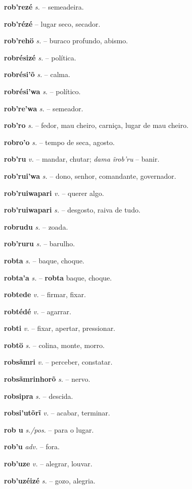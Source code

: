 \textbf{rob'rezé} \textit{s.} -- semeadeira.

\textbf{rob'rézé} \textit{} -- lugar seco, secador.

\textbf{rob'rehö} \textit{s.} -- buraco profundo, abismo.

\textbf{robrésizé} \textit{s.} -- política.

\textbf{robrési'õ} \textit{s.} -- calma.

\textbf{robrési'wa} \textit{s.} -- político.

\textbf{rob're'wa} \textit{s.} -- semeador.

\textbf{rob'ro} \textit{s.} -- fedor, mau cheiro, carniça, lugar de mau cheiro.

\textbf{robro'o} \textit{s.} -- tempo de seca, agosto.

\textbf{rob'ru} \textit{v.} -- mandar, chutar; \textit{dama ĩrob'ru} -- banir.

\textbf{rob'rui'wa} \textit{s.} -- dono, senhor, comandante, governador.

\textbf{rob'ruiwapari} \textit{v.} -- querer algo.

\textbf{rob'ruiwapari} \textit{s.} -- desgosto, raiva de tudo.

\textbf{robrudu} \textit{s.} -- zoada.

\textbf{rob'ruru} \textit{s.} -- barulho.

\textbf{robta} \textit{s.} -- baque, choque.

\textbf{robta'a} \textit{s.} -- \textbf{robta} baque, choque.

\textbf{robtede} \textit{v.} -- firmar, fixar.

\textbf{robtédé} \textit{v.} -- agarrar.

\textbf{robti} \textit{v.} -- fixar, apertar, pressionar.

\textbf{robtö} \textit{s.} -- colina, monte, morro.

\textbf{robsãmri} \textit{v.} -- perceber, constatar.

\textbf{robsãmrinhorõ} \textit{s.} -- nervo.

\textbf{robsipra} \textit{s.} -- descida.

\textbf{robsi'utõrĩ} \textit{v.} -- acabar, terminar.

\textbf{rob u} \textit{s./pos.} -- para o lugar.

\textbf{rob'u} \textit{adv.} -- fora.

\textbf{rob'uze} \textit{v.} -- alegrar, louvar.

\textbf{rob'uzéizé} \textit{s.} -- gozo, alegria.

